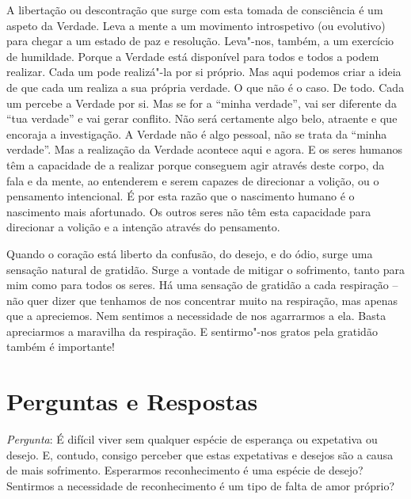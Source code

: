 A libertação ou descontração que surge com esta tomada de consciência é um
aspeto da Verdade. Leva a mente a um movimento introspetivo (ou evolutivo) para
chegar a um estado de paz e resolução. Leva"-nos, também, a um exercício de
humildade. Porque a Verdade está disponível para todos e todos a podem realizar.
Cada um pode realizá"-la por si próprio. Mas aqui podemos criar a ideia de que
cada um realiza a sua própria verdade. O que não é o caso. De todo. Cada um
percebe a Verdade por si. Mas se for a ``minha verdade'', vai ser diferente da
``tua verdade'' e vai gerar conflito. Não será certamente algo belo, atraente e
que encoraja a investigação. A Verdade não é algo pessoal, não se trata da
``minha verdade''. Mas a realização da Verdade acontece aqui e agora. E os seres
humanos têm a capacidade de a realizar porque conseguem agir através deste
corpo, da fala e da mente, ao entenderem e serem capazes de direcionar a
volição, ou o pensamento intencional. É por esta razão que o nascimento humano é
o nascimento mais afortunado. Os outros seres não têm esta capacidade para
direcionar a volição e a intenção através do pensamento.

Quando o coração está liberto da confusão, do desejo, e do ódio, surge uma
sensação natural de gratidão. Surge a vontade de mitigar o sofrimento, tanto
para mim como para todos os seres. Há uma sensação de gratidão a cada respiração
-- não quer dizer que tenhamos de nos concentrar muito na respiração, mas apenas
que a apreciemos. Nem sentimos a necessidade de nos agarrarmos a ela. Basta
apreciarmos a maravilha da respiração. E sentirmo"-nos gratos pela gratidão
também é importante!

\clearpage

\section{Perguntas e Respostas}

\emph{Pergunta}: É difícil viver sem qualquer espécie de esperança ou expetativa
ou desejo. E, contudo, consigo perceber que estas expetativas e desejos são a
causa de mais sofrimento. Esperarmos reconhecimento é uma espécie de desejo?
Sentirmos a necessidade de reconhecimento é um tipo de falta de amor próprio?

